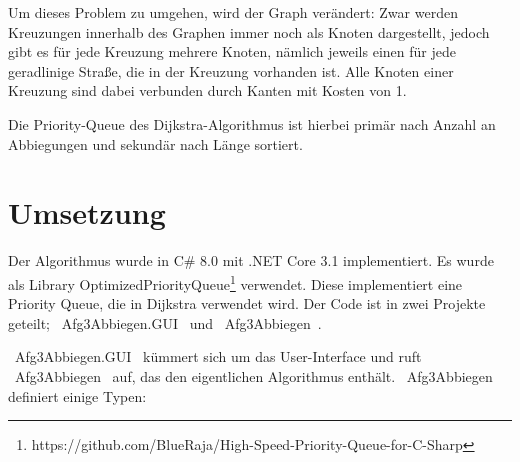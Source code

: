 \documentclass{article}
\theoremstyle{nonumberplain}
\begin{document}
Um dieses Problem zu umgehen, wird der Graph verändert: Zwar werden
Kreuzungen innerhalb des Graphen immer noch als Knoten dargestellt, jedoch gibt es für jede Kreuzung mehrere Knoten, nämlich jeweils einen für jede geradlinige Straße, die in der Kreuzung vorhanden ist.
Alle Knoten einer Kreuzung sind dabei verbunden durch Kanten mit Kosten von 1.

\begin{center}
\end{center}

Die Priority-Queue des Dijkstra-Algorithmus ist hierbei primär nach Anzahl an Abbiegungen und sekundär nach Länge sortiert.

\section{Umsetzung}

Der Algorithmus wurde in C\# 8.0 mit .NET Core 3.1 implementiert.
Es wurde als Library OptimizedPriorityQueue\footnote{https://github.com/BlueRaja/High-Speed-Priority-Queue-for-C-Sharp} verwendet. Diese implementiert eine Priority Queue, die in Dijkstra verwendet wird.
Der Code ist in zwei Projekte geteilt;
~Afg3Abbiegen.GUI~ und ~Afg3Abbiegen~.

~Afg3Abbiegen.GUI~ kümmert sich um das User-Interface und ruft ~Afg3Abbiegen~ auf, das den eigentlichen Algorithmus enthält.
~Afg3Abbiegen~ definiert einige Typen:
\end{document}
